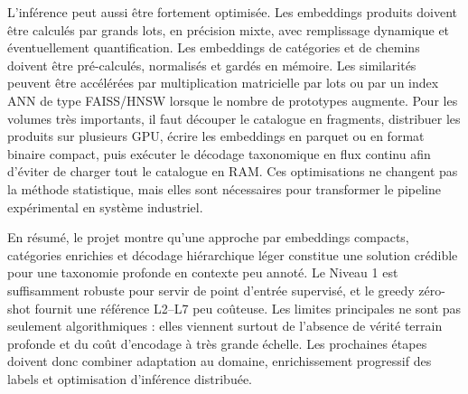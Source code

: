 \documentclass[12pt,a4paper]{report}
\begin{document}
L'inférence peut aussi être fortement optimisée. Les embeddings produits doivent être calculés par grands lots, en précision mixte, avec remplissage dynamique et éventuellement quantification. Les embeddings de catégories et de chemins doivent être pré-calculés, normalisés et gardés en mémoire. Les similarités peuvent être accélérées par multiplication matricielle par lots ou par un index ANN de type FAISS/HNSW lorsque le nombre de prototypes augmente. Pour les volumes très importants, il faut découper le catalogue en fragments, distribuer les produits sur plusieurs GPU, écrire les embeddings en parquet ou en format binaire compact, puis exécuter le décodage taxonomique en flux continu afin d'éviter de charger tout le catalogue en RAM. Ces optimisations ne changent pas la méthode statistique, mais elles sont nécessaires pour transformer le pipeline expérimental en système industriel.

En résumé, le projet montre qu'une approche par embeddings compacts, catégories enrichies et décodage hiérarchique léger constitue une solution crédible pour une taxonomie profonde en contexte peu annoté. Le Niveau 1 est suffisamment robuste pour servir de point d'entrée supervisé, et le greedy zéro-shot fournit une référence L2--L7 peu coûteuse. Les limites principales ne sont pas seulement algorithmiques : elles viennent surtout de l'absence de vérité terrain profonde et du coût d'encodage à très grande échelle. Les prochaines étapes doivent donc combiner adaptation au domaine, enrichissement progressif des labels et optimisation d'inférence distribuée.
\end{document}
